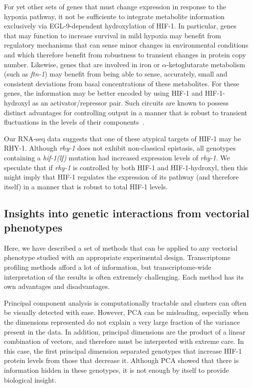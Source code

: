 \documentclass[9pt,twocolumn,twoside,lineno]{pnas-new}
\newcommand{\gene}[1]{\mbox{\emph{#1}}}
\newcommand{\ftna}{\gene{ftn-1}}
\newcommand{\hif}{\gene{hif-1(lf)}}
\newcommand{\eglp}{EGL-9}
\newcommand{\rhyp}{RHY-1}
\newcommand{\hifp}{HIF-1}
\begin{document}
For yet other sets of genes that must change expression in response to the
hypoxia pathway, it not be sufficiente to integrate metabolite
information exclusively via \eglp{}-dependent hydroxylation of \hifp{}. In
particular, genes that may function to increase survival in mild hypoxia may
benefit from regulatory mechanisms that can sense minor changes in environmental
conditions and which therefore benefit from robustness to transient changes in
protein copy number. Likewise, genes that are involved in iron or
$\alpha$-ketoglutarate metabolism (such as \ftna{}) may benefit from being able
to sense, accurately, small and consistent deviations from basal concentrations
of these metabolites. For these genes, the information may be better encoded by
using \hifp{} and \hifp{}-hydroxyl as an activator/repressor pair. Such circuits
are known to possess distinct advantages for controlling output in a manner that
is robust to transient fluctuations in the levels of their
components~\cite{Hart2012,Hart2013}.

Our RNA-seq data suggests that one of these atypical targets of \hifp{} may be
\rhyp{}. Although \gene{rhy-1} does not exhibit non-classical epistasis, all
genotypes containing a \hif{} mutation had increased expression levels of
\gene{rhy-1}. We speculate that if \gene{rhy-1} is controlled by both \hifp{}
and \hifp{}-hydroxyl, then this might imply that \hifp{} regulates the
expression of its pathway (and therefore itself) in a manner that is robust to
total \hifp{} levels.

\subsection*{Insights into genetic interactions from vectorial phenotypes}
Here, we have described a set of methods that can be  applied to any vectorial
phenotype studied with an appropriate experimental design. Transcriptome
profiling methods afford a lot of information, but transcriptome-wide
interpretation of the results is often extremely challenging. Each method has
its own advantages and disadvantages.

Principal component analysis is computationally tractable and clusters can often
be visually detected with ease. However, PCA can be misleading, especially when
the dimensions represented do not explain a very large fraction of the variance
present in the data. In addition, principal dimensions are the product of a
linear combination of vectors, and therefore must be interpreted with extreme
care. In this case, the first principal dimension separated genotypes that
increase \hifp{} protein levels from those that decrease it. Although PCA showed
that there is information hidden in these genotypes, it is not enough by itself
to provide biological insight.
\end{document}
